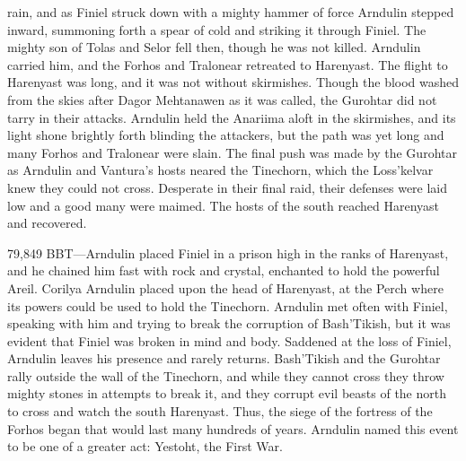 \documentclass[smalldemyvopaper,11pt,twoside,onecolumn,openright,extrafontsizes]{memoir}
\begin{document}
rain, and as Finiel struck down with a mighty hammer of force Arndulin stepped inward, summoning forth a spear of cold and striking it through Finiel. The mighty son of Tolas and Selor fell then, though he was not killed. Arndulin carried him, and the Forhos and Tralonear retreated to Harenyast. The flight to Harenyast was long, and it was not without skirmishes. Though the blood washed from the skies after Dagor Mehtanawen as it was called, the Gurohtar did not tarry in their attacks. Arndulin held the Anariima aloft in the skirmishes, and its light shone brightly forth blinding the attackers, but the path was yet long and many Forhos and Tralonear were slain. The final push was made by the Gurohtar as Arndulin and Vantura’s hosts neared the Tinechorn, which the Loss’kelvar knew they could not cross. Desperate in their final raid, their defenses were laid low and a good many were maimed. The hosts of the south reached Harenyast and recovered.

79,849 BBT—Arndulin placed Finiel in a prison high in the ranks of Harenyast, and he chained him fast with rock and crystal, enchanted to hold the powerful Areil. Corilya Arndulin placed upon the head of Harenyast, at the Perch where its powers could be used to hold the Tinechorn. Arndulin met often with Finiel, speaking with him and trying to break the corruption of Bash’Tikish, but it was evident that Finiel was broken in mind and body. Saddened at the loss of Finiel, Arndulin leaves his presence and rarely returns. Bash’Tikish and the Gurohtar rally outside the wall of the Tinechorn, and while they cannot cross they throw mighty stones in attempts to break it, and they corrupt evil beasts of the north to cross and watch the south Harenyast. Thus, the siege of the fortress of the Forhos began that would last many hundreds of years. Arndulin named this event to be one of a greater act: Yestoht, the First War.
\end{document}
